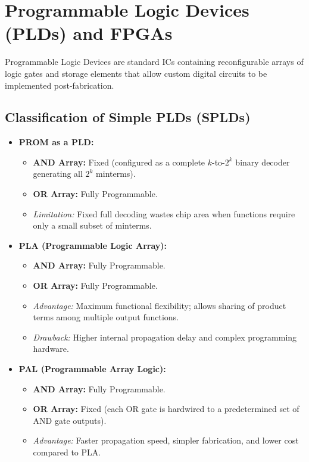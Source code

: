 \documentclass[12pt,a4paper]{article}
\begin{document}
\section{Programmable Logic Devices (PLDs) and FPGAs}

Programmable Logic Devices are standard ICs containing reconfigurable arrays of logic gates and storage elements that allow custom digital circuits to be implemented post-fabrication.

\subsection{Classification of Simple PLDs (SPLDs)}
\begin{tcolorbox}[defbox, title={\textbf{Architectural Comparison of PROM, PLA, and PAL}}]
\begin{itemize}[leftmargin=*, itemsep=4pt]
  \item \textbf{PROM as a PLD:}
    \begin{itemize}
      \item \textbf{AND Array:} Fixed (configured as a complete $k$-to-$2^k$ binary decoder generating all $2^k$ minterms).
      \item \textbf{OR Array:} Fully Programmable.
      \item \textit{Limitation:} Fixed full decoding wastes chip area when functions require only a small subset of minterms.
    \end{itemize}
  \item \textbf{PLA (Programmable Logic Array):}
    \begin{itemize}
      \item \textbf{AND Array:} Fully Programmable.
      \item \textbf{OR Array:} Fully Programmable.
      \item \textit{Advantage:} Maximum functional flexibility; allows sharing of product terms among multiple output functions.
      \item \textit{Drawback:} Higher internal propagation delay and complex programming hardware.
    \end{itemize}
  \item \textbf{PAL (Programmable Array Logic):}
    \begin{itemize}
      \item \textbf{AND Array:} Fully Programmable.
      \item \textbf{OR Array:} Fixed (each OR gate is hardwired to a predetermined set of AND gate outputs).
      \item \textit{Advantage:} Faster propagation speed, simpler fabrication, and lower cost compared to PLA.
    \end{itemize}
\end{itemize}
\end{tcolorbox}
\end{document}
